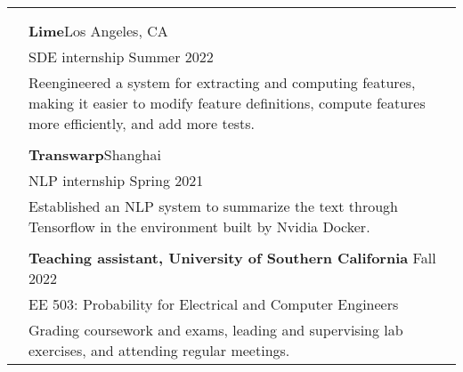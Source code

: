 \documentclass[letterpaper, 11pt]{article}
\begin{document}
\begin{longtable}{p{1.3in}p{4.8in}}
& \\


& \\


{\color{black}{Industry experience}} 
& {\textbf{Lime}}\hfill Los Angeles, CA \\
& SDE internship \hfill Summer 2022 \\
& Reengineered a system for extracting and computing features, making it easier to modify feature definitions, compute features more efficiently, and add more tests.\\
&\\

& {\textbf{Transwarp}}\hfill Shanghai\\
& NLP internship \hfill Spring 2021 \\
& Established an NLP system to summarize the text through Tensorflow in the environment built by Nvidia Docker.\\
& \\



{\color{black}{Teaching experience}} 
& \textbf{Teaching assistant, University of Southern California} \hfill Fall 2022 \\
& EE 503: Probability for Electrical and Computer Engineers \\
& Grading coursework and exams, leading and supervising lab exercises, and attending regular meetings. \\


\end{longtable}
\end{document}
